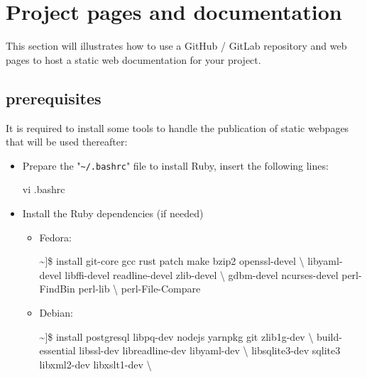 \newpage
\section{Project pages and documentation}

This section will illustrates how to use a GitHub / GitLab repository and web pages to host a static web documentation for your project. 

\subsection{prerequisites}

It is required to install some tools to handle the publication of static webpages that will be used thereafter:
\begin{itemize}
\item Prepare the "\texttt{\textasciitilde/.bashrc}" file to install Ruby, insert the following lines:
\begin{scripti}
\fprompt{~} vi .bashrc
 \bad{=}
 \bad{=}
 \bad{=}
 
 \bad{=}
\end{scripti}
\item Install the Ruby dependencies (if needed)
\begin{itemize}
\item Fedora:
\vspace{-0.25cm}
{\footnotesize{
\begin{scriptii}
\textasciitilde]\$   install git-core gcc rust patch make bzip2 openssl-devel \textbackslash
                      libyaml-devel libffi-devel readline-devel zlib-devel \textbackslash
                      gdbm-devel ncurses-devel perl-FindBin perl-lib \textbackslash
                      perl-File-Compare
\end{scriptii}
}}
\item Debian:
\vspace{-0.25cm}
{\footnotesize{
\begin{scriptii}
\textasciitilde]\$   install postgresql libpq-dev nodejs yarnpkg git zlib1g-dev \textbackslash
                      build-essential libssl-dev libreadline-dev libyaml-dev \textbackslash
                      libsqlite3-dev sqlite3 libxml2-dev libxslt1-dev \textbackslash

\end{scriptii}}}
\end{itemize}
\end{itemize}
